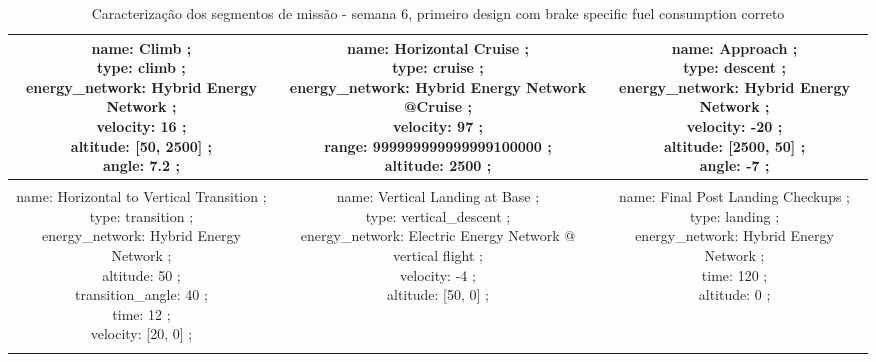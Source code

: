 \begin{table}[h]
\begin{adjustbox}{width=1\textwidth}
\begin{tabular}{|c|c|c|}
\makecell{name: Climb ; \\ type: climb ; \\ energy\_network: Hybrid Energy Network ; \\ velocity: 16 ; \\ altitude: [50, 2500] ; \\ angle: 7.2 ; \\ } & \makecell{name: Horizontal Cruise ; \\ type: cruise ; \\ energy\_network: Hybrid Energy Network @Cruise ; \\ velocity: 97 ; \\ range: 999999999999999100000 ; \\ altitude: 2500 ; \\ } & \makecell{name: Approach ; \\ type: descent ; \\ energy\_network: Hybrid Energy Network ; \\ velocity: -20 ; \\ altitude: [2500, 50] ; \\ angle: -7 ; \\ }\\ \hline \\ 
\makecell{name: Horizontal to Vertical Transition ; \\ type: transition ; \\ energy\_network: Hybrid Energy Network ; \\ altitude: 50 ; \\ transition\_angle: 40 ; \\ time: 12 ; \\ velocity: [20, 0] ; \\ } & \makecell{name: Vertical Landing at Base ; \\ type: vertical\_descent ; \\ energy\_network: Electric Energy Network @ vertical flight ; \\ velocity: -4 ; \\ altitude: [50, 0] ; \\ } & \makecell{name: Final Post Landing Checkups ; \\ type: landing ; \\ energy\_network: Hybrid Energy Network ; \\ time: 120 ; \\ altitude: 0 ; \\ }\\ \hline \\ 
\end{tabular} 

 \caption{Caracterização dos segmentos de missão - semana 6, primeiro design com brake specific fuel consumption correto} \label{"tabela_wrong_fuel_consumption"}
 \end{adjustbox}
 \end{table} 
 \FloatBarrier 
